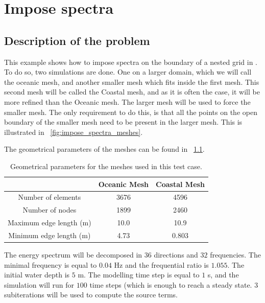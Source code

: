 \chapter{Impose spectra}
%

\section{Description of the problem}
%
This example shows how to impose spectra on the boundary of a nested grid in
\tomawac. To do so, two simulations are done. One on a larger domain, which we
will call the oceanic mesh, and another smaller mesh which fits inside the
first mesh. This second mesh will be called the Coastal mesh, and as it is
often the case, it will be more refined than the Oceanic mesh. The larger mesh
will be used to force the smaller mesh. The only requirement to do this, is
that all the points on the open boundary of the smaller mesh need to be present
in the larger mesh. This is illustrated in
\figurename~\ref{fig:impose_spectra_meshes}.

The geometrical parameters of the meshes can be found in
\tablename~\ref{tab:impose_spectra_meshes}.

\begin{table}[H]
\begin{center}
%
\caption{Geometrical parameters for the meshes used in this test case.}
\label{tab:impose_spectra_meshes}
%
\begin{tabular*}{0.7\linewidth}{@{\extracolsep{\fill}}ccc}
\toprule
\toprule
 & \textbf{Oceanic Mesh} & \textbf{Coastal Mesh} \\
\midrule
Number of elements      & 3676 & 4596  \\
Number of nodes         & 1899 & 2460  \\
Maximum edge length (m) & 10.0 & 10.9  \\
Minimum edge length (m) & 4.73 & 0.803 \\
\bottomrule
\bottomrule
\end{tabular*}
%
\end{center}
\end{table}

The energy spectrum will be decomposed in $36$ directions and $32$ frequencies.
The minimal frequency is equal to $0.04$ Hz and the frequential ratio is
$1.055$. The initial water depth is $5$ m. The modelling time step is equal to
$1$ s, and the simulation will run for $100$ time steps (which is enough to
reach a steady state. $3$ subiterations will be used to compute the source
terms.

